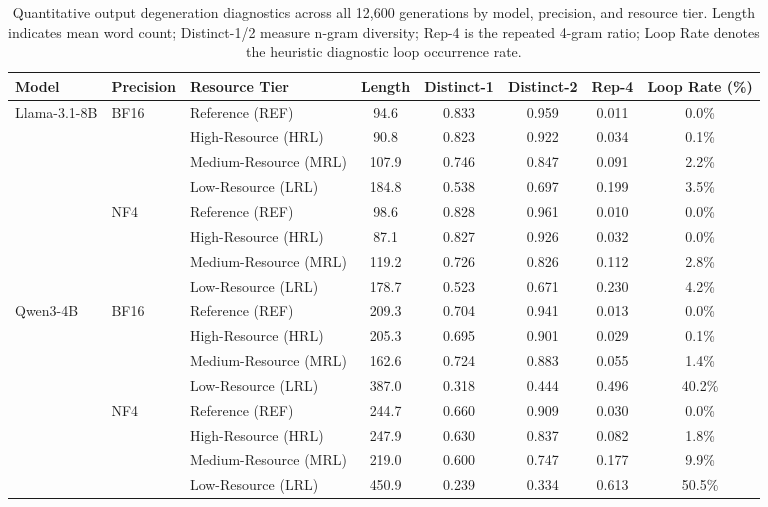 \documentclass{article}
\newcommand{\qwen}{Qwen3-4B}
\newcommand{\llama}{Llama-3.1-8B}
\begin{document}
\begin{table}[h]
\centering
\footnotesize
\setlength{\tabcolsep}{4.2pt}
\caption{Quantitative output degeneration diagnostics across all 12{,}600 generations by model, precision, and resource tier. Length indicates mean word count; Distinct-1/2 measure n-gram diversity; Rep-4 is the repeated 4-gram ratio; Loop Rate denotes the heuristic diagnostic loop occurrence rate.}
\label{tab:degen}
\vspace{3pt}
\begin{tabular}{lllccccc}
\toprule
Model & Precision & Resource Tier & Length & Distinct-1 & Distinct-2 & Rep-4 & Loop Rate (\%) \\
\midrule
\multirow{4}{*}{\llama{}}
  & \multirow{4}{*}{BF16}
    & Reference (REF)      & 94.6  & 0.833 & 0.959 & 0.011 & 0.0\% \\
  & & High-Resource (HRL)   & 90.8  & 0.823 & 0.922 & 0.034 & 0.1\% \\
  & & Medium-Resource (MRL) & 107.9 & 0.746 & 0.847 & 0.091 & 2.2\% \\
  & & Low-Resource (LRL)    & 184.8 & 0.538 & 0.697 & 0.199 & 3.5\% \\
\cmidrule{2-8}
  & \multirow{4}{*}{NF4}
    & Reference (REF)      & 98.6  & 0.828 & 0.961 & 0.010 & 0.0\% \\
  & & High-Resource (HRL)   & 87.1  & 0.827 & 0.926 & 0.032 & 0.0\% \\
  & & Medium-Resource (MRL) & 119.2 & 0.726 & 0.826 & 0.112 & 2.8\% \\
  & & Low-Resource (LRL)    & 178.7 & 0.523 & 0.671 & 0.230 & 4.2\% \\
\midrule
\multirow{4}{*}{\qwen{}}
  & \multirow{4}{*}{BF16}
    & Reference (REF)      & 209.3 & 0.704 & 0.941 & 0.013 & 0.0\% \\
  & & High-Resource (HRL)   & 205.3 & 0.695 & 0.901 & 0.029 & 0.1\% \\
  & & Medium-Resource (MRL) & 162.6 & 0.724 & 0.883 & 0.055 & 1.4\% \\
  & & Low-Resource (LRL)    & 387.0 & 0.318 & 0.444 & 0.496 & 40.2\% \\
\cmidrule{2-8}
  & \multirow{4}{*}{NF4}
    & Reference (REF)      & 244.7 & 0.660 & 0.909 & 0.030 & 0.0\% \\
  & & High-Resource (HRL)   & 247.9 & 0.630 & 0.837 & 0.082 & 1.8\% \\
  & & Medium-Resource (MRL) & 219.0 & 0.600 & 0.747 & 0.177 & 9.9\% \\
  & & Low-Resource (LRL)    & 450.9 & 0.239 & 0.334 & 0.613 & 50.5\% \\
\bottomrule
\end{tabular}
\vspace{-4pt}
\end{table}
\end{document}
